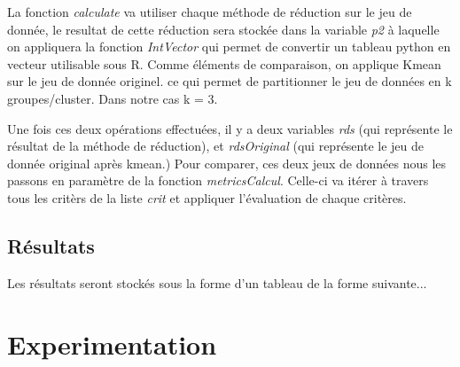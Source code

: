 La fonction \textit{calculate} va utiliser chaque méthode de réduction sur le jeu de donnée, le resultat de cette réduction sera stockée dans
la variable \textit{p2} à laquelle on appliquera la fonction \textit{IntVector} qui permet de convertir un tableau python en vecteur utilisable sous R. 
Comme éléments de comparaison, on applique Kmean sur le jeu de donnée originel. ce qui permet de partitionner le jeu de données en k groupes/cluster. 
Dans notre cas k = 3.

Une fois ces deux opérations effectuées, il y a deux variables \textit{rds} (qui représente le résultat de la méthode de réduction), et \textit{rdsOriginal} (qui représente le jeu de
donnée original après kmean.) Pour comparer, ces deux jeux de données nous les passons en paramètre de la fonction \textit{metricsCalcul}.
Celle-ci va itérer à travers tous les critèrs de la liste \textit{crit} et appliquer l'évaluation de chaque critères.

\subsection{Résultats}
Les résultats seront stockés sous la forme d'un tableau de la forme suivante...

\section{Experimentation}
